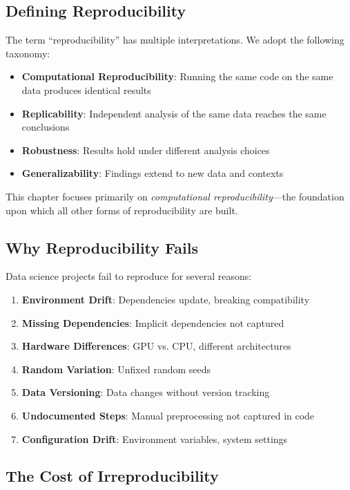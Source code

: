 \subsection{Defining Reproducibility}

The term ``reproducibility'' has multiple interpretations. We adopt the following taxonomy:

\begin{itemize}
    \item \textbf{Computational Reproducibility}: Running the same code on the same data produces identical results
    \item \textbf{Replicability}: Independent analysis of the same data reaches the same conclusions
    \item \textbf{Robustness}: Results hold under different analysis choices
    \item \textbf{Generalizability}: Findings extend to new data and contexts
\end{itemize}

This chapter focuses primarily on \textit{computational reproducibility}---the foundation upon which all other forms of reproducibility are built.

\subsection{Why Reproducibility Fails}

Data science projects fail to reproduce for several reasons:

\begin{enumerate}
    \item \textbf{Environment Drift}: Dependencies update, breaking compatibility
    \item \textbf{Missing Dependencies}: Implicit dependencies not captured
    \item \textbf{Hardware Differences}: GPU vs. CPU, different architectures
    \item \textbf{Random Variation}: Unfixed random seeds
    \item \textbf{Data Versioning}: Data changes without version tracking
    \item \textbf{Undocumented Steps}: Manual preprocessing not captured in code
    \item \textbf{Configuration Drift}: Environment variables, system settings
\end{enumerate}

\subsection{The Cost of Irreproducibility}

